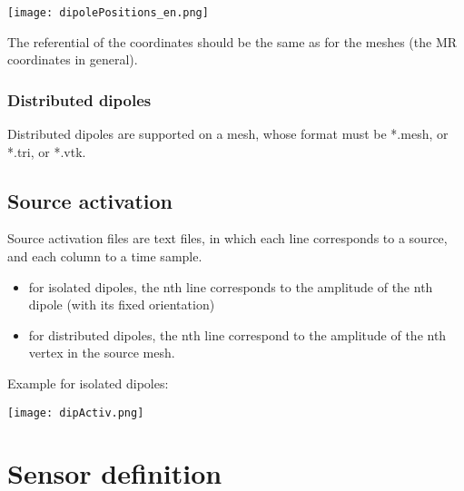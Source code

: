 \centerline{\texttt{[image: dipolePositions\_en.png]}}

\begin{note}
	The referential of the coordinates should be the same as for the meshes (the MR coordinates in general).
\end{note}
\subsubsection{Distributed dipoles}
Distributed dipoles are supported on a mesh, whose format must be *.mesh, or *.tri, or *.vtk.
\subsection{Source activation}
\label{sec:activ}

\noindent

Source activation files are text files, in which each line corresponds to a source, and each column to a time sample.
\begin{itemize}
    \item for isolated dipoles, the nth line corresponds to the amplitude of the nth dipole (with its fixed orientation) 
    \item for distributed dipoles, the nth line correspond to the amplitude of the nth vertex in the source mesh.
\end{itemize}

\medskip

\noindent
Example for isolated dipoles:

\centerline{\texttt{[image: dipActiv.png]}}


\section{Sensor definition}
\label{sec:sensors}

